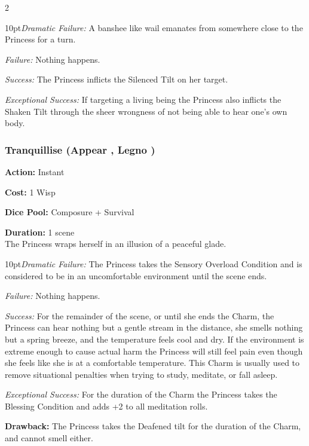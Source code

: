 \begin{multicols}{2}
\begin{myindentpar}{10pt}\emph{Dramatic Failure:} A banshee like wail emanates from somewhere close to the Princess for a turn.

    \emph{Failure:} Nothing happens. 

    \emph{Success:} The Princess inflicts the Silenced Tilt on her target. 

    \emph{Exceptional Success:} If targeting a living being the Princess also inflicts the Shaken Tilt through the sheer wrongness of not being able to hear one's own body. \end{myindentpar}

\subsubsection*{Tranquillise (Appear \textbullet, Legno \textbullet )}

\noindent \textbf{Action:} Instant

\noindent \textbf{Cost:} 1 Wisp 

\noindent \textbf{Dice Pool:} Composure + Survival

\noindent \textbf{Duration:} 1 scene \\

\noindent The Princess wraps herself in an illusion of a peaceful glade. 

\begin{myindentpar}{10pt}\emph{Dramatic Failure:} The Princess takes the Sensory Overload Condition and is considered to be in an uncomfortable environment until the scene ends. 

    \emph{Failure:} Nothing happens. 

    \emph{Success:} For the remainder of the scene, or until she ends the Charm, the Princess can hear nothing but a gentle stream in the distance, she smells nothing but a spring breeze, and the temperature feels cool and dry. If the environment is extreme enough to cause actual harm the Princess will still feel pain even though she feels like she is at a comfortable temperature. This Charm is usually used to remove situational penalties when trying to study, meditate, or fall asleep.

    \emph{Exceptional Success:} For the duration of the Charm the Princess takes the Blessing Condition and adds +2 to all meditation rolls. \end{myindentpar}

\noindent \textbf{Drawback:} The Princess takes the Deafened tilt for the duration of the Charm, and cannot smell either. 


\end{multicols}
